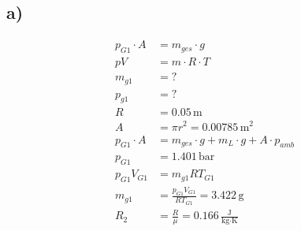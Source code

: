 

\subsection*{a)}

\begin{align*}
    p_{G1} \cdot A &= m_{ges} \cdot g \\
    pV &= m \cdot R \cdot T \\
    m_{g1} &= ? \\
    p_{g1} &= ? \\
    R &= 0.05 \, \text{m} \\
    A &= \pi r^2 = 0.00785 \, \text{m}^2 \\
    p_{G1} \cdot A &= m_{ges} \cdot g + m_{L} \cdot g + A \cdot p_{amb} \\
    p_{G1} &= \boxed{1.401 \, \text{bar}} \\
    p_{G1} V_{G1} &= m_{g1} R T_{G1} \\
    m_{g1} &= \frac{p_{G1} V_{G1}}{R T_{G1}} = \boxed{3.422 \, \text{g}} \\
    R_2 &= \frac{R}{\mu} = 0.166 \, \frac{\text{J}}{\text{kg} \cdot \text{K}}
\end{align*}